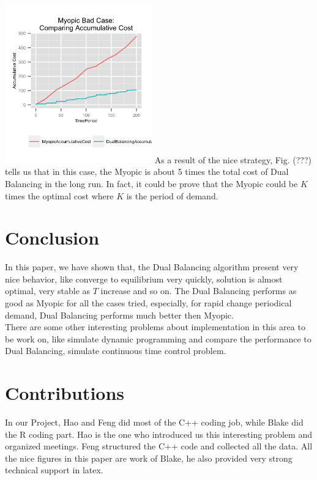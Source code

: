 \documentclass[twoside]{article}
\begin{document}
\begin{multicols}{2}
  \includegraphics[width=2.5in]{figures/MyopicBadAccumulativeCost.png}
  As a result of the nice strategy, Fig. (???) tells us that in this case, the Myopic is about 5 times the total cost of Dual Balancing in the long run. In fact, it could be prove that the Myopic could be $K$ times the optimal cost where $K$ is the period of demand.

\section{Conclusion}

In this paper, we have shown that, the Dual Balancing algorithm present very nice behavior, like converge to equilibrium very quickly, solution is almost optimal, very stable as $T$ increase and so on. The Dual Balancing performs as good as Myopic for all the cases tried, especially, for rapid change periodical demand, Dual Balancing performs much better then Myopic.\\
There are some other interesting problems about implementation in this area to be work on, like simulate dynamic programming and compare the performance to Dual Balancing, simulate continuous time control problem. 

\section{Contributions}
In our Project, Hao and Feng did most of the C++ coding job, while Blake did the R coding part. Hao is the one who introduced us this interesting problem and organized meetings. Feng structured the C++ code and collected all the data. All the nice figures in this paper are work of Blake, he also provided very strong technical support in latex. 



\end{multicols}
\end{document}
